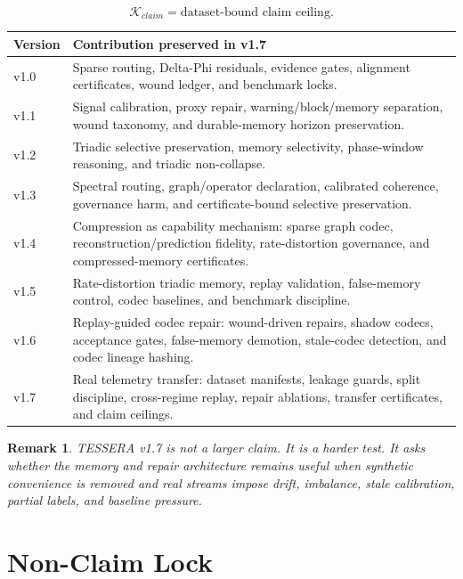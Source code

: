\documentclass[12pt]{article}
\newtheorem{remark}{Remark}
\begin{document}
\[
\mathcal{K}_{claim}=\text{dataset-bound claim ceiling}.
\]

\begin{longtable}{p{}p{}}
\toprule
\textbf{Version} & \textbf{Contribution preserved in v1.7} \\
\midrule
v1.0 & Sparse routing, Delta-Phi residuals, evidence gates, alignment certificates, wound ledger, and benchmark locks. \\
v1.1 & Signal calibration, proxy repair, warning/block/memory separation, wound taxonomy, and durable-memory horizon preservation. \\
v1.2 & Triadic selective preservation, memory selectivity, phase-window reasoning, and triadic non-collapse. \\
v1.3 & Spectral routing, graph/operator declaration, calibrated coherence, governance harm, and certificate-bound selective preservation. \\
v1.4 & Compression as capability mechanism: sparse graph codec, reconstruction/prediction fidelity, rate-distortion governance, and compressed-memory certificates. \\
v1.5 & Rate-distortion triadic memory, replay validation, false-memory control, codec baselines, and benchmark discipline. \\
v1.6 & Replay-guided codec repair: wound-driven repairs, shadow codecs, acceptance gates, false-memory demotion, stale-codec detection, and codec lineage hashing. \\
v1.7 & Real telemetry transfer: dataset manifests, leakage guards, split discipline, cross-regime replay, repair ablations, transfer certificates, and claim ceilings. \\
\bottomrule
\end{longtable}

\begin{remark}
TESSERA v1.7 is not a larger claim. It is a harder test. It asks whether the
memory and repair architecture remains useful when synthetic convenience is
removed and real streams impose drift, imbalance, stale calibration, partial
labels, and baseline pressure.
\end{remark}

\section{Non-Claim Lock}
\end{document}
